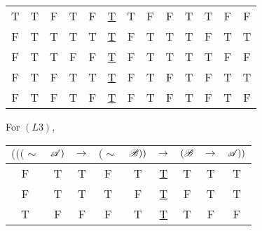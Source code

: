 \begin{enumerate}
\begin{center}
\begin{tabular}{ccccccccccccc}
        T& %
        T& %
        F& %
        T& %
        F& %
        \underline{T}&
        T& %
        F& %
        F& %
        T& %
        T& %
        F& %
        F\\%

        F& %
        T& %
        T& %
        T& %
        T& %
        \underline{T}&
        F& %
        T& %
        T& %
        T& %
        F& %
        T& %
        T\\%

        F& %
        T& %
        T& %
        F& %
        F& %
        \underline{T}&
        F& %
        T& %
        T& %
        T& %
        T& %
        F& %
        F\\%

        F& %
        T& %
        F& %
        T& %
        T& %
        \underline{T}&
        F& %
        T& %
        F& %
        T& %
        F& %
        T& %
        T\\%

        F& %
        T& %
        F& %
        T& %
        F& %
        \underline{T}&
        F& %
        T& %
        F& %
        T& %
        F& %
        T& %
        F\\%
      \end{tabular}
    \end{center}

    For \((L3)\),
    \begin{center}
      \begin{tabular}{ccccccccc}
        \((((\sim\)&
        \(\mathscr{A})\)&
        \(\rightarrow\)&
        \((\sim\)&
        \(\mathscr{B}))\)&
        \(\rightarrow\)&
        \((\mathscr{B}\)&
        \(\rightarrow\)&
        \(\mathscr{A}))\)\\\hline

        F& %
        T& %
        T& %
        F& %
        T& %
        \underline{T}& %
        T& %
        T& %
        T\\%

        F& %
        T& %
        T& %
        T& %
        F& %
        \underline{T}& %
        F& %
        T& %
        T\\%

        T& %
        F& %
        F& %
        F& %
        T& %
        \underline{T}& %
        T& %
        F& %
        F\\%


\end{tabular}
\end{center}
\end{enumerate}
